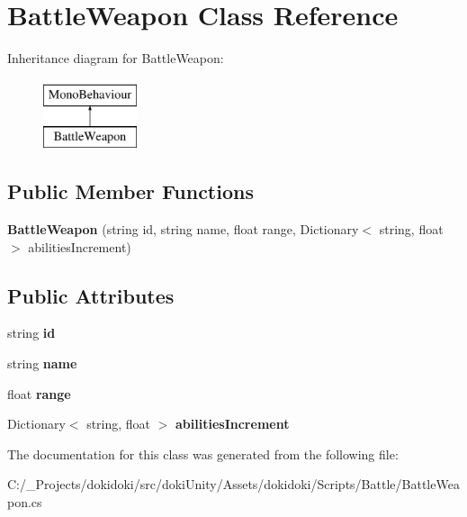 \hypertarget{class_battle_weapon}{}\section{Battle\+Weapon Class Reference}
\label{class_battle_weapon}
Inheritance diagram for Battle\+Weapon\+:\begin{figure}[H]
\begin{center}
\leavevmode
\includegraphics[height=2.000000cm]{class_battle_weapon}
\end{center}
\end{figure}
\subsection*{Public Member Functions}
\begin{DoxyCompactItemize}
\item 
{\bfseries Battle\+Weapon} (string id, string name, float range, Dictionary$<$ string, float $>$ abilities\+Increment)\hypertarget{class_battle_weapon_a136924753a1e4e0049c554dc529ae2f4}{}\label{class_battle_weapon_a136924753a1e4e0049c554dc529ae2f4}

\end{DoxyCompactItemize}
\subsection*{Public Attributes}
\begin{DoxyCompactItemize}
\item 
string {\bfseries id}\hypertarget{class_battle_weapon_a1bba1e991cca0328254e73635e6b139b}{}\label{class_battle_weapon_a1bba1e991cca0328254e73635e6b139b}

\item 
string {\bfseries name}\hypertarget{class_battle_weapon_a09dbeda557fd0f8b5eb4da38e0bca218}{}\label{class_battle_weapon_a09dbeda557fd0f8b5eb4da38e0bca218}

\item 
float {\bfseries range}\hypertarget{class_battle_weapon_a79449ce010b712b57c10f1e131228fdc}{}\label{class_battle_weapon_a79449ce010b712b57c10f1e131228fdc}

\item 
Dictionary$<$ string, float $>$ {\bfseries abilities\+Increment}\hypertarget{class_battle_weapon_a8a5465f8a29e81d3746786e428169519}{}\label{class_battle_weapon_a8a5465f8a29e81d3746786e428169519}

\end{DoxyCompactItemize}


The documentation for this class was generated from the following file\+:\begin{DoxyCompactItemize}
\item 
C\+:/\+\_\+\+Projects/dokidoki/src/doki\+Unity/\+Assets/dokidoki/\+Scripts/\+Battle/Battle\+Weapon.\+cs\end{DoxyCompactItemize}
